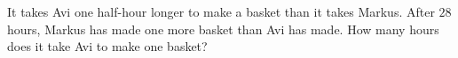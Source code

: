 It takes Avi one half-hour longer to make a basket than it takes Markus. After $28$ hours, Markus has made one more basket than Avi has made. How many hours does it take Avi to make one basket?
